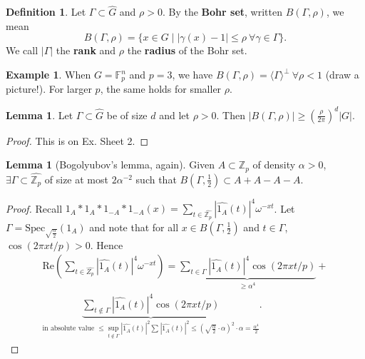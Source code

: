 \documentclass{article}
\theoremstyle{definition}
\newtheorem{lemma}[theorem]{Lemma}
\newtheorem{example}[theorem]{Example}
\newtheorem{defn}[theorem]{Definition}
\begin{document}
\begin{defn}
    Let $\Gamma \subset \widehat{G}$ and $\rho>0$. By the \textbf{Bohr set}, written $B(\Gamma,\rho)$, we mean \[
    B(\Gamma,\rho) = \{x \in G \mid \left|\gamma(x)-1 \right|\le \rho ~\forall \gamma \in \Gamma\}.
    \]
    We call $\left|\Gamma \right|$ the \textbf{rank} and $\rho$ the \textbf{radius} of the Bohr set.
\end{defn}
\begin{example}
    When $G = \mathbb{F}_p^n$ and $p = 3$, we have $B(\Gamma,\rho) = \langle \Gamma \rangle^\perp ~\forall \rho<1$ (draw a picture!). For larger $p$, the same holds for smaller $\rho$.
\end{example}
\begin{lemma}
    Let $\Gamma \subset \widehat{G}$ be of size $d$ and let $\rho > 0$. Then $\left|B(\Gamma,\rho) \right| \ge \left(\frac{\rho}{2\pi}\right)^d\left|G \right|$.
\end{lemma}
\begin{proof}
    This is on Ex. Sheet 2.
\end{proof}
\begin{lemma}[Bogolyubov's lemma, again]
    Given $A \subset \mathbb{Z}_p$ of density $\alpha > 0$, $\exists \Gamma \subset \widehat{\mathbb{Z}_p}$ of size at most $2\alpha^{-2}$ such that $B\left(\Gamma,\frac{1}{2}\right) \subset A + A - A - A$.
\end{lemma}
\begin{proof}
    Recall $1_A * 1_A * 1_{-A} * 1_{-A}(x) = \sum_{t \in \widehat{\mathbb{Z}_p}}^{} \left|\widehat{1_A}(t) \right|^4 \omega^{-xt}$. Let $\Gamma = \text{Spec}_{\sqrt{\frac{\alpha}{2}}}(1_A)$ and note that for all $x \in B\left(\Gamma,\frac{1}{2}\right)$ and $t \in \Gamma$, $\cos(2\pi xt/p)>0$. Hence 
    \begin{align*}
        \text{Re}\left(\sum_{t \in \widehat{Z_p}}^{} \left|\widehat{1_A}(t) \right|^4\omega^{-xt}\right) = \underbrace{\sum_{t \in \Gamma}^{} \left|\widehat{1_A}(t) \right|^4 \cos \left(2\pi xt/p\right)}_{\ge \alpha^4} + \\
        \underbrace{\sum_{t \not\in \Gamma}^{} \left|\widehat{1_A}(t) \right|^4 \cos(2\pi xt/p)}_{\text{in absolute value }\le \sup_{t \not\in \Gamma}\left|\widehat{1_A}(t) \right|^2\sum_{}^{} \left|\widehat{1_A}(t) \right|^2 \le \left(\sqrt{\frac{\alpha}{2}}\cdot \alpha\right)^2\cdot \alpha =\frac{\alpha^4}{2}}.
    \end{align*}
\end{proof}
\end{document}
